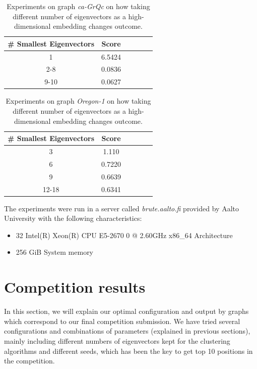 \documentclass[11pt]{extarticle}
\begin{document}
\begin{table}[H]
\centering
\begin{tabular}{|c|c|c|c|c|c|}
\hline
\textbf{\# Smallest Eigenvectors} & \textbf{Score} \\ \hline
1  & 6.5424  \\ \hline
2-8 & 0.0836 \\ \hline
9-10 & 0.0627\\ \hline
\end{tabular}
\caption{Experiments on graph \textit{ca-GrQc} on how taking different number of eigenvectors as a high-dimensional embedding changes outcome.}
\end{table}

\begin{table}[H]
\centering
\begin{tabular}{|c|c|c|c|c|c|}
\hline
\textbf{\# Smallest Eigenvectors} & \textbf{Score} \\ \hline
3 &  1.110\\ \hline
6 &  0.7220\\ \hline
9  & 0.6639 \\ \hline 
12-18  & 0.6341 \\ \hline
\end{tabular}
\caption{Experiments on graph \textit{Oregon-1} on how taking different number of eigenvectors as a high-dimensional embedding changes outcome.}
\end{table}

The experiments were run in a server called \textit{brute.aalto.fi} provided by Aalto University with the following characteristics:
\begin{itemize}
    \item  32 Intel(R) Xeon(R) CPU E5-2670 0 @ 2.60GHz x86\_64 Architecture
    \item  256 GiB System memory
\end{itemize}

\section{Competition results}

In this section, we will explain our optimal configuration and output by graphs which correspond to our final competition submission. We have tried several configurations and combinations of parameters (explained in previous sections), mainly including different numbers of eigenvectors kept for the clustering algorithms and different seeds, which has been the key to get top 10 positions in the competition.\\
\end{document}
